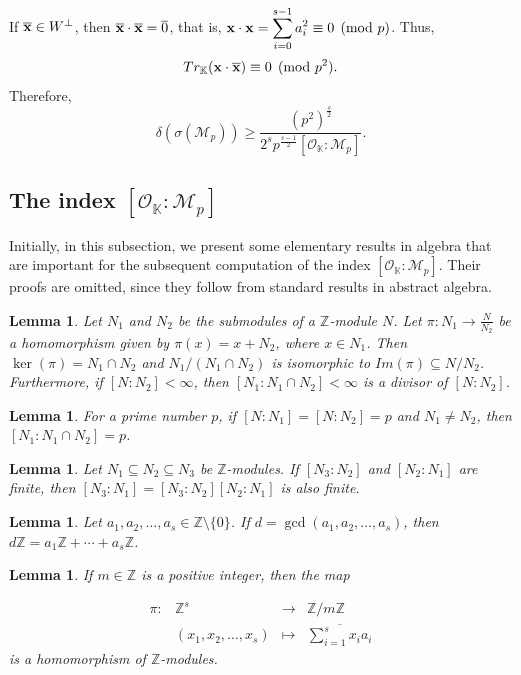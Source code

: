 \documentclass{amsart}
\newtheorem{lemma}[theorem]{Lemma}
\begin{document}
If $\overline{\bf x}\in W^{\perp}$, then $\overline{\bf x}\cdot\overline{\bf x}=\overline{0}$, that is, $\displaystyle {\bf x}\cdot {\bf x}=\sum_{i=0}^{s-1}a_i^2\equiv 0 \pmod{p}$. Thus, \[ Tr_{\mathbb{K}}({\bf x}\cdot\overline{\bf x})\equiv 0 \pmod{p^2}. \] Therefore, \begin{equation}\label{eq-s-cong1}
    \delta(\sigma(\mathcal{M}_p)) \geq \frac{(p^2)^{\frac{s}{2}}}{2^sp^{\frac{s-1}{2}}[\mathcal{O}_{\mathbb{K}}:\mathcal{M}_p]}. \end{equation}

\subsection{The index $[\mathcal{O}_{\mathbb{K}}:\mathcal{M}_p]$}

Initially, in this subsection, we present some elementary results in algebra that are important for the subsequent computation of the index $[\mathcal{O}_{\mathbb{K}}:\mathcal{M}_p]$. Their proofs are omitted, since they follow from standard results in abstract algebra.

\begin{lemma} \label{lem-2} Let $N_1$ and $N_2$ be the submodules of a $\mathbb{Z}$-module $N$. Let $\pi:N_1\rightarrow \frac{N}{N_2}$ be a homomorphism given by $\pi(x)=x+N_2$, where $x\in N_1$. Then $\ker(\pi) = N_1\cap N_2$ and $N_1/(N_1\cap N_2)$ is isomorphic to $Im(\pi)\subseteq N/N_2$. Furthermore, if $[N:N_2]<\infty$, then $[N_1:N_1\cap N_2]<\infty$ is a divisor of $[N:N_2]$.\end{lemma}

\begin{lemma} \label{cor-2} For a prime number $p$, if $[N:N_1]=[N:N_2]=p$ and $N_1\neq N_2$, then $[N_1:N_1\cap N_2]=p$. \end{lemma} 

\begin{lemma} \label{lem-3} Let $N_1\subseteq N_2\subseteq N_3$ be $\mathbb{Z}$-modules. If $[N_3:N_2]$ and $[N_2:N_1]$ are finite, then $[N_3:N_1]=[N_3:N_2][N_2:N_1]$ is also finite. \end{lemma}

\begin{lemma} \label{lem-4} Let $a_1,a_2,\ldots,a_s\in\mathbb{Z}\setminus\{0\}$. If $d=\gcd(a_1,a_2,\ldots,a_s)$, then $d\mathbb{Z}=a_1\mathbb{Z}+\cdots+a_s\mathbb{Z}$. \end{lemma}

\begin{lemma} \label{cor-3} If $m\in\mathbb{Z}$ is a positive integer, then the map

\[\begin{array}{llll} \pi:&\mathbb{Z}^s&\rightarrow& \mathbb{Z}/m\mathbb{Z}\\
& (x_1,x_2,\ldots,x_s) &\mapsto & \overline{\sum_{i=1}^s x_i a_i}
\end{array} \]
is a homomorphism of $\mathbb{Z}$-modules. \end{lemma}
\end{document}

